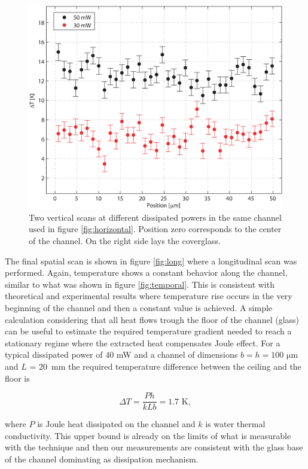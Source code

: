 \documentclass[twocolumn]{svjour3}       %
\begin{document}
\begin{figure}[h!]
\centering
\includegraphics[width=\columnwidth]{figs/vertical.eps}
\caption{Two vertical scans at different dissipated powers in the same channel used in figure \ref{fig:horizontal}. Position zero corresponds to the center of the channel. On the right side lays the coverglass.\label{fig:vertical}}
\end{figure}

The final spatial scan is shown in figure \ref{fig:long} where a longitudinal scan was performed. Again, temperature shows a constant behavior along the channel, similar to what was shown in figure \ref{fig:temporal}. This is consistent with theoretical and experimental results \cite{jouleteorico,xuan2008} where temperature rise occurs in the very beginning of the channel and then a constant value is achieved. A simple calculation considering that all heat flows trough the floor of the channel (glass) can be useful to estimate the required temperature gradient needed to reach a stationary regime where the extracted heat compensates Joule effect. For a typical dissipated power of 40 mW and a channel of dimensions $b = h = 100$ $\mathrm{\mu m}$ and $L$ = 20~mm the required temperature difference between the ceiling and the floor is 

\begin{equation}
\Delta T = \frac{Ph}{kLb} = 1.7\,\, \mathrm{K},
\end{equation}

where $P$ is Joule heat dissipated on the channel and $k$ is water thermal conductivity. This upper bound is already on the limits of what is measurable with the technique and then our measurements are consistent with the glass base of the channel dominating as dissipation mechanism. 
\end{document}
